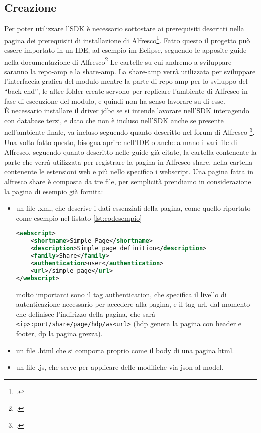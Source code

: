 \subsection{Creazione}
Per poter utilizzare l'SDK è necessario sottostare ai prerequisiti descritti nella pagina dei prerequisiti di installazione di Alfresco\footcite{site:alfresco-prerequisites}.
Fatto questo il progetto può essere importato in un IDE, ad esempio im Eclipse, seguendo le apposite guide nella documentazione di Alfresco\footcite{site:alfresco-rad}
Le cartelle su cui andremo a sviluppare saranno la repo-amp e la share-amp. La share-amp verrà utilizzata per sviluppare l’interfaccia grafica del modulo mentre la parte di repo-amp  per lo sviluppo del “back-end”, le altre folder create servono per replicare l’ambiente di Alfresco in fase di esecuzione del modulo, e quindi non ha senso lavorare su di esse.\\
È necessario installare il driver jdbc se si intende  lavorare nell’SDK interagendo con database terzi, e dato che non è incluso nell'SDK anche se presente nell'ambiente finale, va incluso seguendo quanto descritto nel forum di Alfresco \footcite{site:alfresco-jdbc}. 
Una volta fatto questo, bisogna aprire nell’IDE o anche a mano i vari file di Alfresco, seguendo quanto descritto nelle guide già citate, la cartella contenente la parte che verrà utilizzata per registrare la pagina in Alfresco share, nella cartella contenente le estensioni web e più nello specifico i webscript. %
Una pagina fatta in alfresco share è composta da tre file, per semplicità prendiamo in considerazione la pagina di esempio già fornita:
\begin{itemize}
\item un file .xml, che descrive i dati essenziali della pagina, come quello riportato come esempio nel listato \ref{lst:codesempio}
\begin{lstlisting}[language=XML, caption=codice di una pagina di esempio, label=lst:codesempio]
<webscript>
    <shortname>Simple Page</shortname>
    <description>Simple page definition</description>
    <family>Share</family>
    <authentication>user</authentication>
    <url>/simple-page</url>
</webscript>
\end{lstlisting}
molto importanti sono il tag authentication, che specifica il livello di autenticazione necessario per accedere alla pagina, e il tag url, dal momento che definisce l’indirizzo della pagina, che sarà \texttt{<ip>:port/share/page/hdp/ws<url>} (hdp genera la pagina con header e footer, dp la pagina grezza).
\item un file .html che si comporta proprio come il body di una pagina html.
\item un file .js, che serve per applicare delle modifiche via json al model.
\end{itemize}
